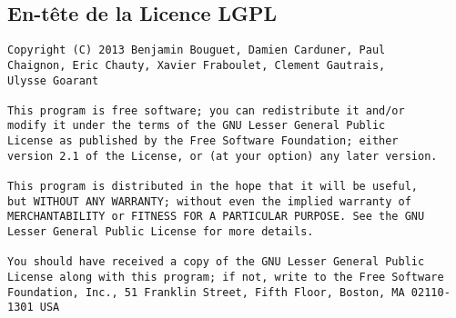 \begin{appendices}

	\chapter{En-tête de la Licence LGPL}
	\label{licence}

\begin{lstlisting}
Copyright (C) 2013 Benjamin Bouguet, Damien Carduner, Paul 
Chaignon, Eric Chauty, Xavier Fraboulet, Clement Gautrais, 
Ulysse Goarant

This program is free software; you can redistribute it and/or
modify it under the terms of the GNU Lesser General Public
License as published by the Free Software Foundation; either
version 2.1 of the License, or (at your option) any later version.

This program is distributed in the hope that it will be useful,
but WITHOUT ANY WARRANTY; without even the implied warranty of
MERCHANTABILITY or FITNESS FOR A PARTICULAR PURPOSE. See the GNU
Lesser General Public License for more details.

You should have received a copy of the GNU Lesser General Public
License along with this program; if not, write to the Free Software
Foundation, Inc., 51 Franklin Street, Fifth Floor, Boston, MA 02110-1301 USA
\end{lstlisting}

\end{appendices}